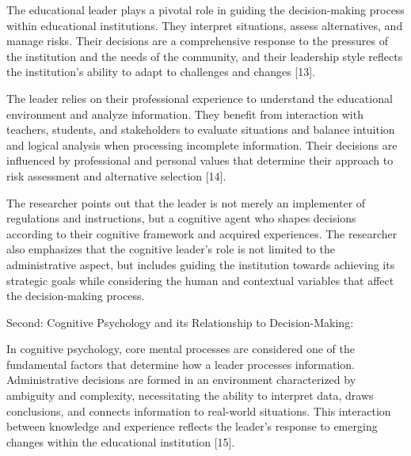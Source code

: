\documentclass[10pt]{NSP1}
\begin{document}
\par\medskip{}\smallskip

The educational leader plays a pivotal role in guiding the decision-making process within educational institutions. They interpret situations, assess alternatives, and manage risks. Their decisions are a comprehensive response to the pressures of the institution and the needs of the community, and their leadership style reflects the institution's ability to adapt to challenges and changes [13].

The leader relies on their professional experience to understand the educational environment and analyze information. They benefit from interaction with teachers, students, and stakeholders to evaluate situations and balance intuition and logical analysis when processing incomplete information. Their decisions are influenced by professional and personal values ​​that determine their approach to risk assessment and alternative selection [14].

The researcher points out that the leader is not merely an implementer of regulations and instructions, but a cognitive agent who shapes decisions according to their cognitive framework and acquired experiences. The researcher also emphasizes that the cognitive leader's role is not limited to the administrative aspect, but includes guiding the institution towards achieving its strategic goals while considering the human and contextual variables that affect the decision-making process.

Second: Cognitive Psychology and its Relationship to Decision-Making:

\par\medskip{}\smallskip

In cognitive psychology, core mental processes are considered one of the fundamental factors that determine how a leader processes information. Administrative decisions are formed in an environment characterized by ambiguity and complexity, necessitating the ability to interpret data, draws conclusions, and connects information to real-world situations. This interaction between knowledge and experience reflects the leader's response to emerging changes within the educational institution [15].
\end{document}
